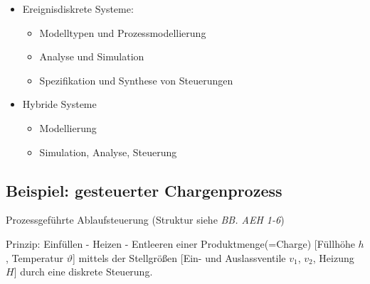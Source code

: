 
\begin{itemize}
	\item Ereignisdiskrete Systeme: 
	\begin{itemize}
		\item Modelltypen und Prozessmodellierung
		\item Analyse und Simulation
		\item Spezifikation und Synthese von Steuerungen
	\end{itemize}
	\item Hybride Systeme
	\begin{itemize}
		\item Modellierung
		\item Simulation, Analyse, Steuerung
	\end{itemize} 
\end{itemize}


\subsection{Beispiel: gesteuerter Chargenprozess}
Prozessgeführte Ablaufsteuerung (Struktur siehe \textit{BB. AEH 1-6})

Prinzip: Einfüllen - Heizen - Entleeren einer Produktmenge(=Charge) [Füllhöhe $h$, Temperatur $\vartheta$] mittels der Stellgrößen [Ein- und Auslassventile $v_1$, $v_2$, Heizung $H$] durch eine diskrete Steuerung.